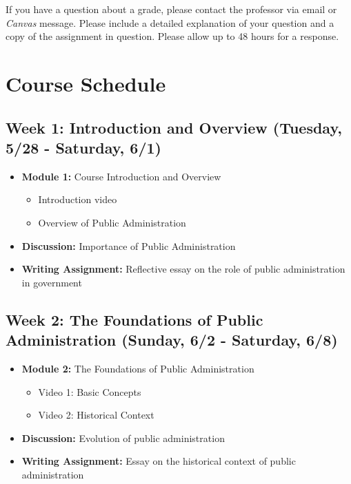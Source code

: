 \documentclass[12pt, letterpaper]{article}
\begin{document}
If you have a question about a grade, please contact the professor via email or \emph{Canvas} message. Please include a detailed explanation of your question and a copy of the assignment in question. Please allow up to 48 hours for a response. 


\section{Course Schedule}

\subsection*{Week 1: Introduction and Overview (Tuesday, 5/28 - Saturday, 6/1)}
\begin{itemize}
    \item \textbf{Module 1:} Course Introduction and Overview
    \begin{itemize}
        \item Introduction video
        \item Overview of Public Administration
    \end{itemize}
    \item \textbf{Discussion:} Importance of Public Administration
    \item \textbf{Writing Assignment:} Reflective essay on the role of public administration in government
\end{itemize}

\subsection*{Week 2: The Foundations of Public Administration (Sunday, 6/2 - Saturday, 6/8)}
\begin{itemize}
    \item \textbf{Module 2:} The Foundations of Public Administration
    \begin{itemize}
        \item Video 1: Basic Concepts
        \item Video 2: Historical Context
    \end{itemize}
    \item \textbf{Discussion:} Evolution of public administration
    \item \textbf{Writing Assignment:} Essay on the historical context of public administration
\end{itemize}
\end{document}
